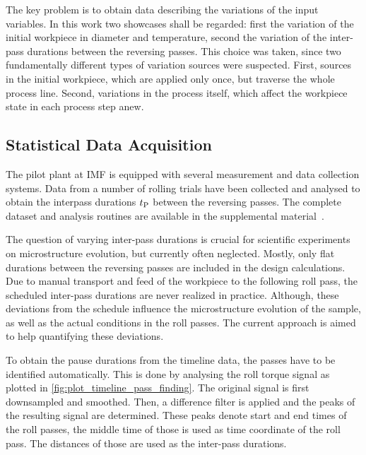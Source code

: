 The key problem is to obtain data describing the variations of the input variables.
In this work two showcases shall be regarded: first the variation of the initial workpiece in diameter and temperature,
second the variation of the inter-pass durations between the reversing passes.
This choice was taken, since two fundamentally different types of variation sources were suspected.
First, sources in the initial workpiece, which are applied only once, but traverse the whole process line.
Second, variations in the process itself, which affect the workpiece state in each process step anew.

\subsection{Statistical Data Acquisition}\label{subsec:data-acquisition}

The pilot plant at IMF is equipped with several measurement and data collection systems.
Data from a number of rolling trials have been collected and analysed to obtain the interpass durations ${t_\mathrm{P}}$ between the reversing passes.
The complete dataset and analysis routines are available in the supplemental material~\cite{WeinerVariationSupplemental2023}.

The question of varying inter-pass durations is crucial for scientific experiments on microstructure evolution, but currently often neglected.
Mostly, only flat durations between the reversing passes are included in the design calculations.
Due to manual transport and feed of the workpiece to the following roll pass, the scheduled inter-pass durations are never realized in practice.
Although, these deviations from the schedule influence the microstructure evolution of the sample, as well as the actual conditions in the roll passes.
The current approach is aimed to help quantifying these deviations.

To obtain the pause durations from the timeline data, the passes have to be identified automatically.
This is done by analysing the roll torque signal as plotted in \autoref{fig:plot_timeline_pass_finding}.
The original signal is first downsampled and smoothed.
Then, a difference filter is applied and the peaks of the resulting signal are determined.
These peaks denote start and end times of the roll passes, the middle time of those is used as time coordinate of the roll pass.
The distances of those are used as the inter-pass durations.

